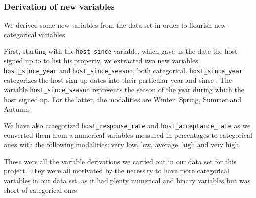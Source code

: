 \begin{comment} %

\subsubsection{Instance selection}

\subsubsection{Data transformation}

\end{comment}

\subsubsection{Derivation of new variables}

We derived some new variables from the data set in order to flourish new
categorical variables.

First, starting with the \texttt{host\_since} variable, which gave us the date
the host signed up to \airbnb to list his property, we extracted two new
variables: \texttt{host\_since\_year} and \texttt{host\_since\_season}, both
categorical. \texttt{host\_since\_year} categorizes the host sign up dates into
their particular year and since .  The variable \texttt{host\_since\_season}
represents the season of the year during which the host signed up. For the
latter, the modalities are Winter, Spring, Summer and Autumn.

We have also categorized \texttt{host\_response\_rate} and
\texttt{host\_acceptance\_rate} as we converted them from a numerical variables
measured in percentages to categorical ones with the following modalities: very
low, low, average, high and very high.

These were all the variable derivations we carried out in our data set for this
project. They were all motivated by the necessity to have more categorical
variables in our data set, as it had plenty numerical and binary variables but
was short of categorical ones.




